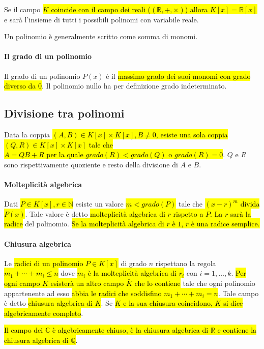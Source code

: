 Se il campo \hl{$K$ coincide con il campo dei reali ($(\mathbb{R}, +, \times)$)
allora $K[x] = \mathbb{R}[x]$} e sarà l'insieme di tutti i possibili polinomi
con variabile reale.

Un polinomio è generalmente scritto come somma di monomi.

\paragraph{Il grado di un polinomio} Il grado di un polinomio $P(x)$ è il
\hl{massimo grado dei suoi monomi con grado diverso da 0}. Il polinomio nullo
ha per definizione grado indeterminato.

\subsection{Divisione tra polinomi}
Data la coppia \hl{$(A, B) \in K[x] \times K[x], B \neq 0$, esiste una sola coppia
$(Q, R) \in K[x] \times K[x]$ tale che \\ $A = QB + R$ per la quale $grado(R) < grado(Q)$
o $grado(R) = 0$}. $Q$ e $R$ sono rispettivamente quoziente e resto della divisione
di $A$ e $B$.

\paragraph{Molteplicità algebrica} Dati \hl{$P \in K[x], r \in \mathbb{N}$} esiste
un valore \hl{$m < grado(P)$} tale che \hl{${(x-r)}^m$ divida $P(x)$}. Tale valore è
detto \hl{molteplicità algebrica di $r$ rispetto a $P$. La $r$ sarà la radice} del
polinomio. \hl{Se la molteplicità algebrica di $r$ è $1$, $r$ è una radice semplice.}

\paragraph{Chiusura algebrica} Le \hl{radici di un polinomio $P \in K[x]$} di grado
$n$ rispettano la regola \\ \hl{$m_1 + \cdots + m_i \leq n$} dove \hl{$m_i$ è la
molteplicità algebrica di $r_i$} con $i = 1, \ldots, k$. \hl{Per ogni campo $K$
esisterà un altro campo $\bar{K}$ che lo contiene} tale che ogni polinomio
appartenente ad esso \hl{abbia le radici che soddisfino $m_1 + \cdots + m_i = n$}.
Tale campo è detto \hl{chiusura algebrica di $K$}. Se \hl{$K$ e la sua chiusura
coincidono, $K$ si dice algebricamente completo}.

\hl{Il campo dei $\mathbb{C}$ è algebricamente chiuso, è la chiusura algebrica di
$\mathbb{R}$ e contiene la chiusura algebrica di $\mathbb{Q}$}. 
